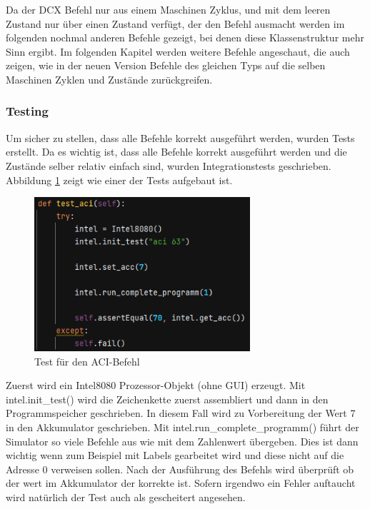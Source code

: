 \documentclass[12pt]{article}
\newcommand{\imgSpaceBefore}{\vspace{10pt}}
\begin{document}
\noindent
Da der DCX Befehl nur aus einem Maschinen Zyklus, und mit dem leeren Zustand nur über einen Zustand verfügt, der den Befehl ausmacht werden im folgenden nochmal anderen Befehle gezeigt, bei denen diese Klassenstruktur mehr Sinn ergibt. Im folgenden Kapitel werden weitere Befehle angeschaut, die auch zeigen, wie in der neuen Version Befehle des gleichen Typs auf die selben Maschinen Zyklen und Zustände zurückgreifen.

\subsubsection{Testing}
Um sicher zu stellen, dass alle Befehle korrekt ausgeführt werden, wurden Tests erstellt. 
Da es wichtig ist, dass alle Befehle korrekt ausgeführt werden und die Zustände selber relativ einfach sind, wurden Integrationstests geschrieben. Abbildung \ref{fig:test_aci} zeigt wie einer der Tests aufgebaut ist. 

\imgSpaceBefore
\begin{figure}[H]
\centering
\includegraphics[width=8cm]{bilder/test_aci}
\caption{Test für den ACI-Befehl}
\label{fig:test_aci}
\end{figure}

\noindent
Zuerst wird ein Intel8080 Prozessor-Objekt (ohne GUI) erzeugt. Mit intel.init\_test() wird die Zeichenkette zuerst assembliert und dann in den Programmspeicher geschrieben. In diesem Fall wird zu Vorbereitung der Wert 7 in den Akkumulator geschrieben. Mit intel.run\_complete\_programm() führt der Simulator so viele Befehle aus wie mit dem Zahlenwert übergeben. Dies ist dann wichtig wenn zum Beispiel mit Labels gearbeitet wird und diese nicht auf die Adresse 0 verweisen sollen. Nach der Ausführung des Befehls wird überprüft ob der wert im Akkumulator der korrekte ist. Sofern irgendwo ein Fehler auftaucht wird natürlich der Test auch als gescheitert angesehen.
\\
\end{document}
